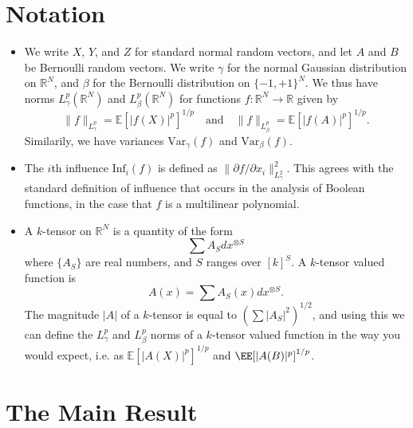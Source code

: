 \documentclass{article}
\theoremstyle{plain}
\theoremstyle{definition}
\begin{document}
\section{Notation}

\begin{itemize}
    \item We write $X$, $Y$, and $Z$ for standard normal random vectors, and let $A$ and $B$ be Bernoulli random vectors. We write $\gamma$ for the normal Gaussian distribution on $\mathbb{R}^N$, and $\beta$ for the Bernoulli distribution on $\{ -1, +1 \}^N$. We thus have norms $L^p_\gamma(\mathbb{R}^N)$ and $L^p_\beta(\mathbb{R}^N)$ for functions $f: \mathbb{R}^N \to \mathbb{R}$ given by
%
\[ \| f \|_{L^p_\gamma} = \mathbb{E}[|f(X)|^p]^{1/p} \quad\text{and}\quad \| f \|_{L^p_\beta} = \mathbb{E}[|f(A)|^p]^{1/p}. \]
%
Similarily, we have variances $\text{Var}_\gamma(f)$ and $\text{Var}_\beta(f)$.

    \item The $i$th influence $\text{Inf}_i(f)$ is defined as $\| \partial f / \partial x_i \|_{L^2_\gamma}^2$. This agrees with the standard definition of influence that occurs in the analysis of Boolean functions, in the case that $f$ is a multilinear polynomial. 

    \item A $k$-tensor on $\mathbb{R}^N$ is a quantity of the form
    \[ \sum A_S dx^{\otimes S} \]
    where $\{ A_S \}$ are real numbers, and $S$ ranges over $[k]^S$. A $k$-tensor valued function is
    \[ A(x) = \sum A_S(x) dx^{\otimes S}. \]
    The magnitude $|A|$ of a $k$-tensor is equal to $(\sum |A_S|^2 )^{1/2}$, and using this we can define the $L^p_\gamma$ and $L^p_\beta$ norms of a $k$-tensor valued function in the way you would expect, i.e. as $\mathbb{E}[|A(X)|^p]^{1/p}$ and $\EE[|A(B)|^p]^{1/p}$. %
\end{itemize}

\section{The Main Result}
\end{document}
